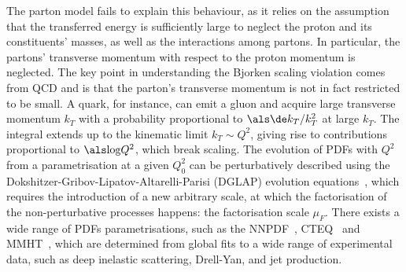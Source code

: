 The parton model fails to explain this behaviour, as it relies on the assumption that the transferred energy is sufficiently large to neglect the proton and its constituents' masses, as well as the interactions among partons. In particular, the partons' transverse momentum with respect to the proton momentum is neglected. The key point in understanding the Bjorken scaling violation comes from QCD and is that the parton's transverse momentum is not in fact restricted to be small. A quark, for instance, can emit a gluon and acquire large transverse momentum $k_T$ with a probability proportional to $\als \de k_T/k_T^2$ at large $k_T$. The integral extends up to the kinematic limit $k_T\sim Q^2$, giving rise to contributions proportional to $\als\mathrm{log}Q^2$, which break scaling. The evolution of PDFs with $Q^2$ from a parametrisation at a given $Q^2_0$ can be perturbatively described using the Dokshitzer-Gribov-Lipatov-Altarelli-Parisi (DGLAP) evolution equations~\cite{Gribov:1972ri,Dokshitzer:1977sg,Altarelli:1977zs}, which requires the introduction of a new arbitrary scale, at which the factorisation of the non-perturbative processes happens: the factorisation scale $\mu_F$. There exists a wide range of PDFs parametrisations, such as the NNPDF~\cite{NNPDF:2021njg}, CTEQ~\cite{Dulat:2015mca} and MMHT~\cite{Harland-Lang:2014zoa}, which are determined from global fits to a wide range of experimental data, such as deep inelastic scattering, Drell-Yan, and jet production.

